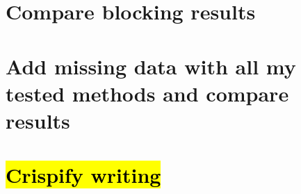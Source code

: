 \documentclass[12pt]{article}
\begin{document}
\section*{Compare blocking results}

\vspace{0.4cm}

\section*{Add missing data with all my tested methods and compare results}

\vspace{0.4cm}

\section*{\hl{Crispify writing}}
\end{document}
